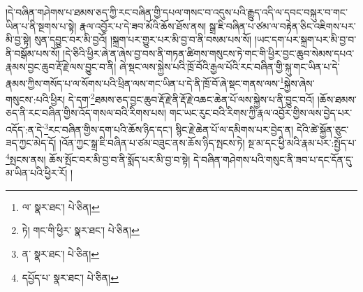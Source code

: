 །དེ་བཞིན་གཤེགས་པ་ཐམས་ཅད་ཀྱི་རང་བཞིན་གྱི་དཔལ་གསང་བ་འདུས་པའི་རྒྱུད་འདི་ལ་དབང་བསྐུར་བ་གང་ཡིན་པ་ནི་སྔགས་པ་སྟེ། རྣལ་འབྱོར་པ་དེ་ཟབ་མོའི་ཆོས་ཐོས་ནས། སྒྲ་ཇི་བཞིན་པ་ཙམ་ལ་བརྟེན་ཅིང་འཇིགས་པར་མི་བྱ་སྟེ། སུན་དབྱུང་བར་མི་བྱའོ། །སྐྲག་པར་གྱུར་པར་མི་བྱ་བ་ནི་བསམ་པས་སོ། །ཡང་དག་པར་སྐྲག་པར་མི་བྱ་བ་ནི་བསྒོམ་པས་སོ། །དེ་ཅིའི་ཕྱིར་ཞེ་ན་ཞེས་བྱ་བས་ནི་གཏན་ཚིགས་གསུངས་ཏེ་གང་གི་ཕྱིར་བྱང་ཆུབ་སེམས་དཔའ་རྣམས་བྱང་ཆུབ་རྡོ་རྗེ་ལས་བྱུང་བ་ནི། ཞེ་སྡང་ལས་སྐྱེས་པའི་ཁྲོ་བོའི་རྒྱལ་པོའི་རང་བཞིན་གྱི་སྐུ་གང་ཡིན་པ་དེ་རྣམས་ཀྱིས་གསོད་པ་ལ་སོགས་པའི་ཕྲིན་ལས་གང་ཡིན་པ་དེ་ནི་ཁྲོ་བོ་ཞེ་སྡང་གནས་ལས་\footnote{ལ་  སྣར་ཐང་།  པེ་ཅིན། }སྐྱེས་ཞེས་གསུངས་:པའི་ཕྱིར། དེ་དག་\footnote{ཏེ། གང་གི་ཕྱིར་  སྣར་ཐང་།  པེ་ཅིན། }ཐམས་ཅད་བྱང་ཆུབ་རྡོ་རྗེ་ནི་རྡོ་རྗེ་འཆང་ཆེན་པོ་ལས་སྐྱེས་པ་ནི་བྱུང་བའོ། །ཆོས་ཐམས་ཅད་ནི་རང་བཞིན་གྱིས་འོད་གསལ་བའི་རིགས་པས། གང་ཡང་རུང་བའི་རིགས་ཀྱི་རྣལ་འབྱོར་གྱིས་ལས་བྱེད་པར་འདོད་:ན་དེ་\footnote{ན་  སྣར་ཐང་།  པེ་ཅིན། }རང་བཞིན་གྱིས་དག་པའི་ཆོས་ཉིད་དང་། སྙིང་རྗེ་ཆེན་པོ་ལ་དམིགས་པར་བྱེད་ན། དེའི་ཚེ་སྐྱོན་ཅུང་ཟད་ཀྱང་མེད་དོ། །འོན་ཀྱང་སྒྲ་ཇི་བཞིན་པ་ཙམ་བཟུང་ནས་ཆོས་ཉིད་སྤངས་ཏེ། སྔ་མ་དང་ཕྱི་མའི་རྣམ་པར་:སྤྱོད་པ་\footnote{དཔྱོད་པ་  སྣར་ཐང་།  པེ་ཅིན། }སྤངས་ནས། ཆོས་སྤོང་བར་མི་བྱ་བ་ནི་སྨོད་པར་མི་བྱ་བ་སྟེ། དེ་བཞིན་གཤེགས་པའི་གསུང་ནི་ཟབ་པ་དང་དོན་དུ་མ་ཡིན་པའི་ཕྱིར་རོ། །

